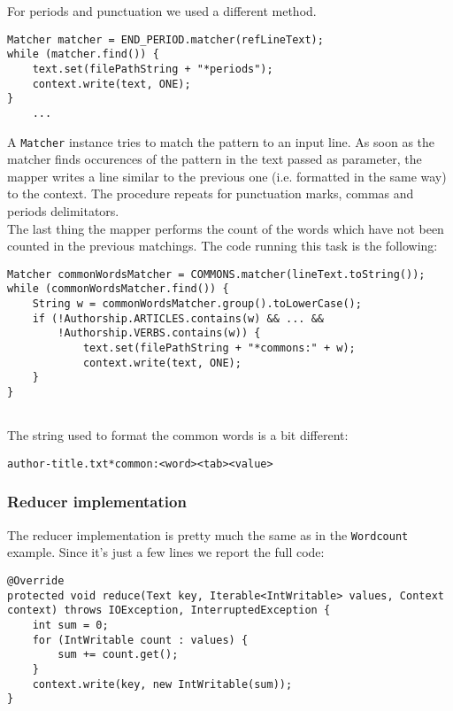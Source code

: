 \documentclass[a4paper,11pt, twoside]{article}
\begin{document}
	\bigskip
	\noindent
	For periods and punctuation we used a different method.
	\begin{lstlisting}[firstnumber=109, caption={Periods counting in Map method}, captionpos=b]
Matcher matcher = END_PERIOD.matcher(refLineText);
while (matcher.find()) {
	text.set(filePathString + "*periods");
	context.write(text, ONE);
}
	...
	\end{lstlisting}
	
	A \lstinline|Matcher| instance tries to match the pattern to an input line. As soon as the matcher finds occurences of the pattern in the text passed as parameter, the mapper writes a line similar to the previous one (i.e. formatted in the same way) to the context. The procedure repeats for punctuation marks, commas and periods delimitators. \\
	
	The last thing the mapper performs the count of the words which have not been counted in the previous matchings. The code running this task is the following:
	\begin{lstlisting}[firstnumber=119, caption={Common words counting in the Map method.}, captionpos=b]
Matcher commonWordsMatcher = COMMONS.matcher(lineText.toString());
while (commonWordsMatcher.find()) {
	String w = commonWordsMatcher.group().toLowerCase();
	if (!Authorship.ARTICLES.contains(w) && ... &&
		!Authorship.VERBS.contains(w)) {
			text.set(filePathString + "*commons:" + w);
			context.write(text, ONE);
	}
}
		
	\end{lstlisting}
	
	The string used to format the common words is a bit different: \begin{center}
		\texttt{author-title.txt*common:\textless word\textgreater\textless tab\textgreater \textless value\textgreater} 
	\end{center}
	
	\subsubsection{Reducer implementation}
	The reducer implementation is pretty much the same as in the \lstinline|Wordcount| example. Since it's just a few lines we report the full code:
	\begin{lstlisting}[firstnumber=152, caption={Reduce method}, captionpos=b]
@Override
protected void reduce(Text key, Iterable<IntWritable> values, Context context) throws IOException, InterruptedException {
	int sum = 0;
	for (IntWritable count : values) {
		sum += count.get();
	}
	context.write(key, new IntWritable(sum));
}
	\end{lstlisting}
	
\end{document}
